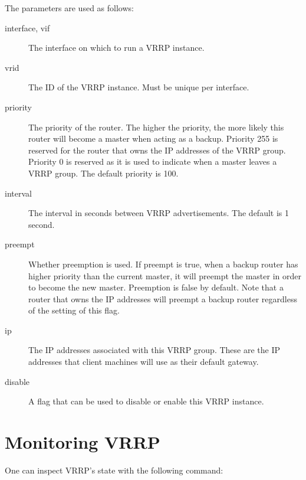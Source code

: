 \noindent
The parameters are used as follows:
\begin{description}
\item[interface, vif] The interface on which to run a VRRP instance.

\item[vrid] The ID of the VRRP instance.  Must be unique per interface.

\item[priority] The priority of the router.  The higher the priority, the more
likely this router will become a master when acting as a backup.  Priority 255
is reserved for the router that owns the IP addresses of the VRRP group.
Priority 0 is reserved as it is used to indicate when a master leaves a VRRP
group.  The default priority is 100.

\item[interval]  The interval in seconds between VRRP advertisements.  The
default is 1 second.

\item[preempt]  Whether preemption is used.  If preempt is true, when a backup
router has higher priority than the current master, it will preempt the master
in order to become the new master.  Preemption is false by default.  Note that a
router that owns the IP addresses will preempt a backup router regardless of the
setting of this flag.

\item[ip]  The IP addresses associated with this VRRP group.  These are the IP
addresses that client machines will use as their default gateway.

\item[disable]  A flag that can be used to disable or enable this VRRP instance.
\end{description}

\section{Monitoring VRRP}
One can inspect VRRP's state with the following command:

\vspace{0.1in}
\noindent{}
\vspace{0.1in}

